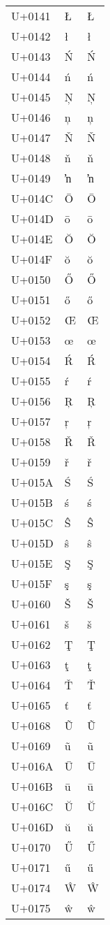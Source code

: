 \documentclass{article}
\begin{document}
\begin{longtable}{lll}
U+0141 & Ł & Ł \\
U+0142 & ł & ł \\
U+0143 & Ń & Ń \\
U+0144 & ń & ń \\
U+0145 & Ņ & Ņ \\
U+0146 & ņ & ņ \\
U+0147 & Ň & Ň \\
U+0148 & ň & ň \\
U+0149 & ŉ & ŉ \\
U+014C & Ō & Ō \\
U+014D & ō & ō \\
U+014E & Ŏ & Ŏ \\
U+014F & ŏ & ŏ \\
U+0150 & Ő & Ő \\
U+0151 & ő & ő \\
U+0152 & Œ & Œ \\
U+0153 & œ & œ \\
U+0154 & Ŕ & Ŕ \\
U+0155 & ŕ & ŕ \\
U+0156 & Ŗ & Ŗ \\
U+0157 & ŗ & ŗ \\
U+0158 & Ř & Ř \\
U+0159 & ř & ř \\
U+015A & Ś & Ś \\
U+015B & ś & ś \\
U+015C & Ŝ & Ŝ \\
U+015D & ŝ & ŝ \\
U+015E & Ş & Ş \\
U+015F & ş & ş \\
U+0160 & Š & Š \\
U+0161 & š & š \\
U+0162 & Ţ & Ţ \\
U+0163 & ţ & ţ \\
U+0164 & Ť & Ť \\
U+0165 & ť & ť \\
U+0168 & Ũ & Ũ \\
U+0169 & ũ & ũ \\
U+016A & Ū & Ū \\
U+016B & ū & ū \\
U+016C & Ŭ & Ŭ \\
U+016D & ŭ & ŭ \\
U+0170 & Ű & Ű \\
U+0171 & ű & ű \\
U+0174 & Ŵ & Ŵ \\
U+0175 & ŵ & ŵ \\

\end{longtable}
\end{document}
